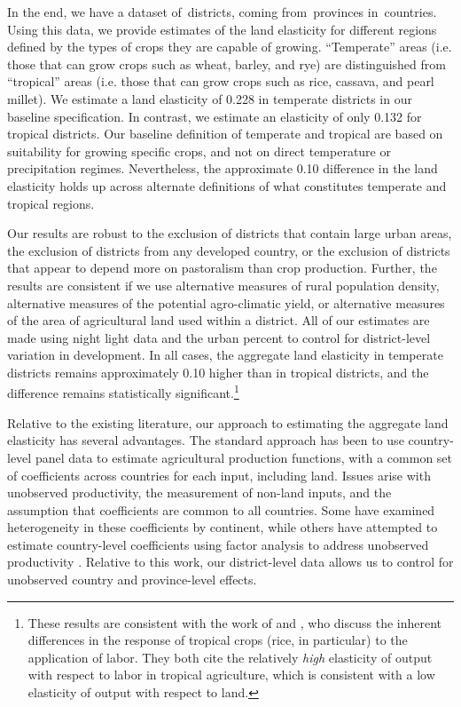 \documentclass[11pt]{article}
\begin{document}
In the end, we have a dataset of\districts \ districts, coming from\provinces \ provinces in\countries \ countries. Using this data, we provide estimates of the land elasticity for different regions defined by the types of crops they are capable of growing. ``Temperate'' areas (i.e. those that can grow crops such as wheat, barley, and rye) are distinguished from ``tropical'' areas (i.e. those that can grow crops such as rice, cassava, and pearl millet). We estimate a land elasticity of 0.228 in temperate districts in our baseline specification. In contrast, we estimate an elasticity of only 0.132 for tropical districts. Our baseline definition of temperate and tropical are based on suitability for growing specific crops, and not on direct temperature or precipitation regimes. Nevertheless, the approximate 0.10 difference in the land elasticity holds up across alternate definitions of what constitutes temperate and tropical regions. 

Our results are robust to the exclusion of districts that contain large urban areas, the exclusion of districts from any developed country, or the exclusion of districts that appear to depend more on pastoralism than crop production. Further, the results are consistent if we use alternative measures of rural population density, alternative measures of the potential agro-climatic yield, or alternative measures of the area of agricultural land used within a district. All of our estimates are made using night light data and the urban percent to control for district-level variation in development. In all cases, the aggregate land elasticity in temperate districts remains approximately 0.10 higher than in tropical districts, and the difference remains statistically significant.\footnote{These results are consistent with the work of \citet{Ruthenberg:1976zr} and \citet{bray1994}, who discuss the inherent differences in the response of tropical crops (rice, in particular) to the application of labor. They both cite the relatively \textit{high} elasticity of output with respect to labor in tropical agriculture, which is consistent with a low elasticity of output with respect to land.} 

Relative to the existing literature, our approach to estimating the aggregate land elasticity has several advantages. The standard approach has been to use country-level panel data \citep{Hayami:1970ly,Hayami:1985cr,cpr1997,mm2001,Mundlak:2000dq,mbl2012,et2013mango} to estimate agricultural production functions, with a common set of coefficients across countries for each input, including land. Issues arise with unobserved productivity, the measurement of non-land inputs, and the assumption that coefficients are common to all countries. Some have examined heterogeneity in these coefficients \citep{gg2003,Wiebe2003Resource-Qualit} by continent, while others have attempted to estimate country-level coefficients using factor analysis to address unobserved productivity \citep{et2013mango,ev2016clim}. Relative to this work, our district-level data allows us to control for unobserved country and province-level effects. 
\end{document}
